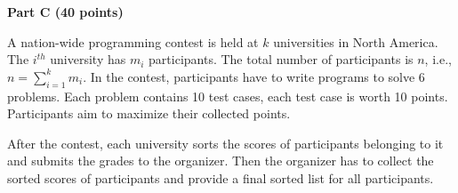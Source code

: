 \documentclass{article}
\begin{document}
\begin{center}
{\bf Part C (40 points)}
\end{center}


 A nation-wide programming contest is held
at $k$ universities in North America. The $i^{th}$ university has
$m_{i}$ participants. The total number of participants is $n$, i.e.,
$n = \sum_{i=1}^{k}m_{i}$. In the contest, participants have to write
programs to solve 6 problems. Each problem contains 10 test cases,
each test case is worth 10 points. Participants aim to maximize their
collected points. 

After the contest, each university sorts the scores of participants
belonging to it and submits the grades to the organizer.  Then the
organizer has to collect the sorted scores of participants and provide
a final sorted list for all participants.
\end{document}

